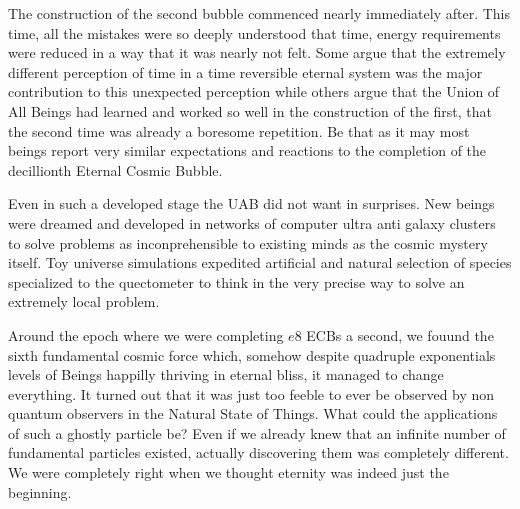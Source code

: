 \documentclass[]{article}
\begin{document}
	
	
	The construction of the second bubble commenced nearly immediately after. This time, all the mistakes were so deeply understood that time, energy requirements were reduced in a way that it was nearly not felt. Some argue that the extremely different perception of time in a time reversible eternal system was the major contribution to this unexpected perception while others argue that the Union of All Beings had learned and worked so well in the construction of the first, that the second time was already a boresome repetition. Be that as it may most beings report very similar expectations and reactions to the completion of the decillionth Eternal Cosmic Bubble.
	
	Even in such a developed stage the UAB did not want in surprises. New beings were dreamed and developed in networks of computer ultra anti galaxy clusters to solve problems as inconprehensible to existing minds as the cosmic mystery itself. Toy universe simulations expedited artificial and natural selection of species specialized to the quectometer to think in the very precise way to solve an extremely local problem.
	
	Around the epoch where we were completing $e8$ ECBs a second, we fouund the sixth fundamental cosmic force which, somehow despite quadruple exponentials levels of Beings happilly thriving in eternal bliss, it managed to change everything. It turned out that it was just too feeble to ever be observed by non quantum observers in the Natural State of Things. What could the applications of such a ghostly particle be? Even if we already knew that an infinite number of fundamental particles existed, actually discovering them was completely different. We were completely right when we thought eternity was indeed just the beginning.
	
	
	
	
	
\end{document}
